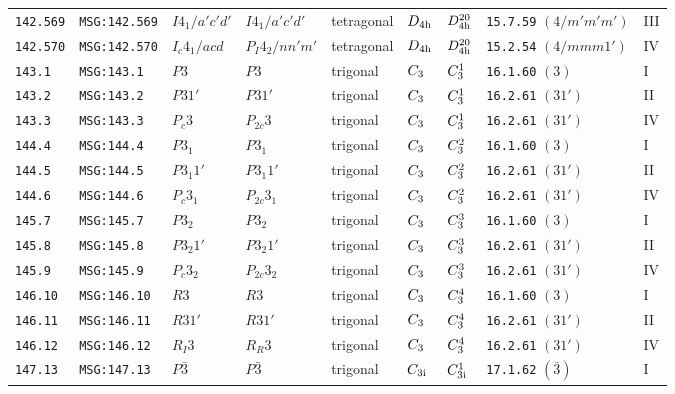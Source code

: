 \documentclass[fleqn,10pt]{jsarticle}
\begin{document}
\begin{center}
\begin{longtable}{lllllllll}
\texttt{142.569} & \texttt{MSG:142.569} & $I4_{1}/a'c'd'$ & $I4_{1}/a'c'd'$ & tetragonal & $D_{\rm 4h}$ & $D_{\rm 4h}^{20}$ & \texttt{15.7.59} $(4/m'm'm')$ & III \\
\texttt{142.570} & \texttt{MSG:142.570} & $I_{c}4_{1}/acd$ & $P_{I}4_{2}/nn'm'$ & tetragonal & $D_{\rm 4h}$ & $D_{\rm 4h}^{20}$ & \texttt{15.2.54} $(4/mmm1')$ & IV \\ \hline
\texttt{143.1} & \texttt{MSG:143.1} & $P3$ & $P3$ & trigonal & $C_{\rm 3}$ & $C_{\rm 3}^{1}$ & \texttt{16.1.60} $(3)$ & I \\
\texttt{143.2} & \texttt{MSG:143.2} & $P31'$ & $P31'$ & trigonal & $C_{\rm 3}$ & $C_{\rm 3}^{1}$ & \texttt{16.2.61} $(31')$ & II \\
\texttt{143.3} & \texttt{MSG:143.3} & $P_{c}3$ & $P_{2c}3$ & trigonal & $C_{\rm 3}$ & $C_{\rm 3}^{1}$ & \texttt{16.2.61} $(31')$ & IV \\ \hline
\texttt{144.4} & \texttt{MSG:144.4} & $P3_{1}$ & $P3_{1}$ & trigonal & $C_{\rm 3}$ & $C_{\rm 3}^{2}$ & \texttt{16.1.60} $(3)$ & I \\
\texttt{144.5} & \texttt{MSG:144.5} & $P3_{1}1'$ & $P3_{1}1'$ & trigonal & $C_{\rm 3}$ & $C_{\rm 3}^{2}$ & \texttt{16.2.61} $(31')$ & II \\
\texttt{144.6} & \texttt{MSG:144.6} & $P_{c}3_{1}$ & $P_{2c}3_{1}$ & trigonal & $C_{\rm 3}$ & $C_{\rm 3}^{2}$ & \texttt{16.2.61} $(31')$ & IV \\ \hline
\texttt{145.7} & \texttt{MSG:145.7} & $P3_{2}$ & $P3_{2}$ & trigonal & $C_{\rm 3}$ & $C_{\rm 3}^{3}$ & \texttt{16.1.60} $(3)$ & I \\
\texttt{145.8} & \texttt{MSG:145.8} & $P3_{2}1'$ & $P3_{2}1'$ & trigonal & $C_{\rm 3}$ & $C_{\rm 3}^{3}$ & \texttt{16.2.61} $(31')$ & II \\
\texttt{145.9} & \texttt{MSG:145.9} & $P_{c}3_{2}$ & $P_{2c}3_{2}$ & trigonal & $C_{\rm 3}$ & $C_{\rm 3}^{3}$ & \texttt{16.2.61} $(31')$ & IV \\ \hline
\texttt{146.10} & \texttt{MSG:146.10} & $R3$ & $R3$ & trigonal & $C_{\rm 3}$ & $C_{\rm 3}^{4}$ & \texttt{16.1.60} $(3)$ & I \\
\texttt{146.11} & \texttt{MSG:146.11} & $R31'$ & $R31'$ & trigonal & $C_{\rm 3}$ & $C_{\rm 3}^{4}$ & \texttt{16.2.61} $(31')$ & II \\
\texttt{146.12} & \texttt{MSG:146.12} & $R_{I}3$ & $R_{R}3$ & trigonal & $C_{\rm 3}$ & $C_{\rm 3}^{4}$ & \texttt{16.2.61} $(31')$ & IV \\ \hline
\texttt{147.13} & \texttt{MSG:147.13} & $P\bar{3}$ & $P\bar{3}$ & trigonal & $C_{\rm 3i}$ & $C_{\rm 3i}^{1}$ & \texttt{17.1.62} $(\bar{3})$ & I \\

\end{longtable}
\end{center}
\end{document}
